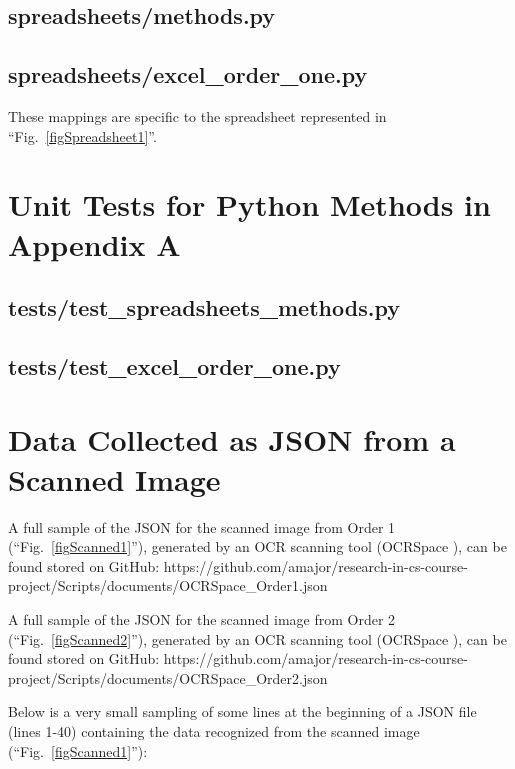 \documentclass[conference, draftcls]{IEEEtran}
\begin{document}
    \subsection{spreadsheets/methods.py}
    

    \subsection{spreadsheets/excel\_order\_one.py}
    These mappings are specific to the spreadsheet represented in ``Fig.~\ref{figSpreadsheet1}''.
    

\newpage
\section{Unit Tests for Python Methods in Appendix A} \label{appendixOrderOneTests}
    \subsection{tests/test\_spreadsheets\_methods.py}
    

    \newpage
    \subsection{tests/test\_excel\_order\_one.py}
    

\newpage
\section{Data Collected as JSON from a Scanned Image} \label{appendixOrderOneJSON}
A full sample of the JSON for the scanned image from Order 1 (``Fig.~\ref{figScanned1}''), generated by an OCR scanning tool (OCRSpace \cite{ocrspace}), can be found stored on GitHub: https://github.com/amajor/research-in-cs-course-project/Scripts/documents/OCRSpace\_Order1.json

A full sample of the JSON for the scanned image from Order 2 (``Fig.~\ref{figScanned2}''), generated by an OCR scanning tool (OCRSpace \cite{ocrspace}), can be found stored on GitHub: https://github.com/amajor/research-in-cs-course-project/Scripts/documents/OCRSpace\_Order2.json

Below is a very small sampling of some lines at the beginning of a JSON file (lines 1-40) containing the data recognized from the scanned image (``Fig.~\ref{figScanned1}''):

\end{document}
